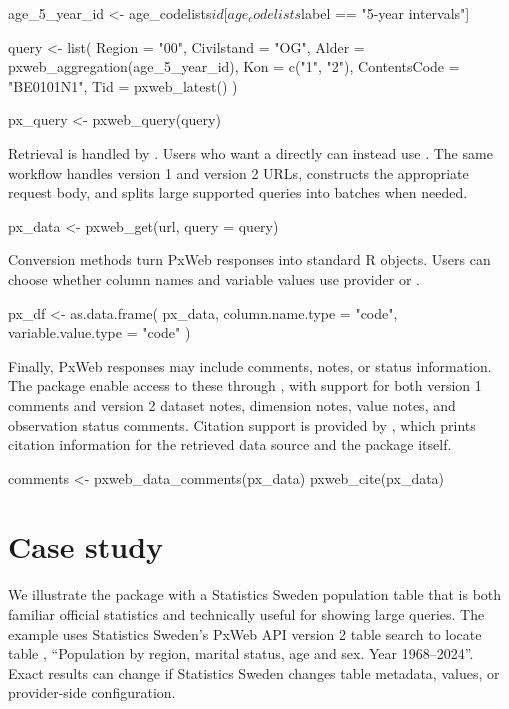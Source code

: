 \begin{example}
age_5_year_id <- age_codelists$id[age_codelists$label == "5-year intervals"]

query <- list(
  Region = "00",
  Civilstand = "OG",
  Alder = pxweb_aggregation(age_5_year_id),
  Kon = c("1", "2"),
  ContentsCode = "BE0101N1",
  Tid = pxweb_latest()
)

px_query <- pxweb_query(query)
\end{example}

Retrieval is handled by .
Users who want a  directly can instead use
.
The same workflow handles version 1 and version 2 URLs, constructs the appropriate request body, and splits large supported queries into batches when needed.

\begin{example}
px_data <- pxweb_get(url, query = query)
\end{example}

Conversion methods turn PxWeb responses into standard R objects.
Users can choose whether column names and variable values use provider  or .

\begin{example}
px_df <- as.data.frame(
  px_data,
  column.name.type = "code",
  variable.value.type = "code"
)
\end{example}

Finally, PxWeb responses may include comments, notes, or status information.
The  package enable access to these through , with support for both version 1 comments and version 2 dataset notes, dimension notes, value notes, and observation status comments.
Citation support is provided by , which prints citation information for the retrieved data source and the  package itself.

\begin{example}
comments <- pxweb_data_comments(px_data)
pxweb_cite(px_data)
\end{example}

\section{Case study}
\label{sec:case-study}

We illustrate the package with a Statistics Sweden population table that is both familiar official statistics and technically useful for showing large queries.
The example uses Statistics Sweden's PxWeb API version 2 table search to locate table , ``Population by region, marital status, age and sex. Year 1968--2024''.
Exact results can change if Statistics Sweden changes table metadata, values, or provider-side configuration.


